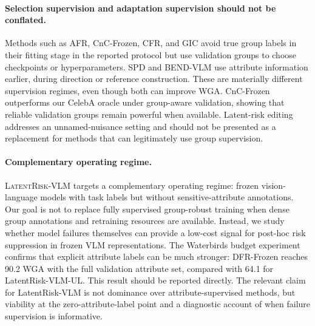 \paragraph{Selection supervision and adaptation supervision should not be conflated.}
Methods such as AFR, CnC-Frozen, CFR, and GIC avoid true group labels in their fitting stage in the reported protocol but use validation groups to choose checkpoints or hyperparameters. SPD and BEND-VLM use attribute information earlier, during direction or reference construction. These are materially different supervision regimes, even though both can improve WGA. CnC-Frozen outperforms our CelebA oracle under group-aware validation, showing that reliable validation groups remain powerful when available. Latent-risk editing addresses an unnamed-nuisance setting and should not be presented as a replacement for methods that can legitimately use group supervision.

\paragraph{Complementary operating regime.}
\textsc{LatentRisk-VLM} targets a complementary operating regime: frozen vision-language models with task labels but without sensitive-attribute annotations. Our goal is not to replace fully supervised group-robust training when dense group annotations and retraining resources are available. Instead, we study whether model failures themselves can provide a low-cost signal for post-hoc risk suppression in frozen VLM representations. The Waterbirds budget experiment confirms that explicit attribute labels can be much stronger: DFR-Frozen reaches 90.2 WGA with the full validation attribute set, compared with 64.1 for LatentRisk-VLM-UL. This result should be reported directly. The relevant claim for LatentRisk-VLM is not dominance over attribute-supervised methods, but viability at the zero-attribute-label point and a diagnostic account of when failure supervision is informative.

